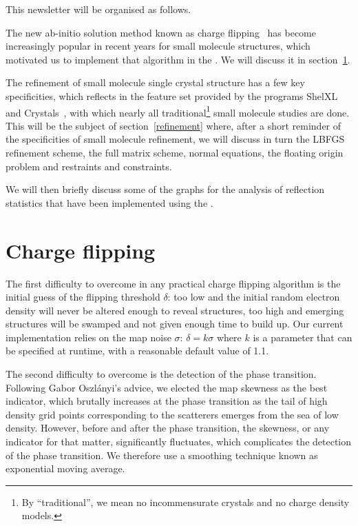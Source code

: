 \documentclass[12pt]{article}
\begin{document}
This newsletter will be organised as follows.

The new ab-initio solution method known as charge flipping~\cite{Oszlanyi:2008,Palatinus:2007} has become increasingly popular in recent years for small molecule structures, which motivated us to implement that algorithm in the \smtbx. We will discuss it in section~\ref{chargeflipping}.

The refinement of small molecule single crystal structure has a few key specificities, which reflects in the feature set provided by the programs ShelXL~\cite{Sheldrick:2008} and Crystals~\cite{Crystals:v12}, with which nearly all traditional\footnote{By ``traditional'', we mean no incommensurate crystals and no charge density models.} small molecule studies are done.
This will be the subject of section~\ref{refinement} where, after a short reminder of the specificities of small molecule refinement, we will discuss in turn the LBFGS refinement scheme, the full matrix scheme, normal equations, the floating origin problem and restraints and constraints.

We will then briefly discuss some of the graphs for the analysis of reflection statistics that have been implemented using the \cctbx.


\section{Charge flipping}
\label{chargeflipping}
The first difficulty to overcome in any practical charge flipping algorithm is the initial guess of the flipping threshold $\delta$: too low and the initial random electron density will never be altered enough to reveal structures, too high and emerging structures will be swamped and not given enough time to build up. Our current implementation relies on the map noise $\sigma$: $\delta = k \sigma$ where $k$ is a parameter that can be specified at runtime, with a reasonable default value of 1.1.

The second difficulty to overcome is the detection of the phase transition.  Following Gabor Oszlányi's advice, we elected the map skewness as the best indicator, which brutally increases at the phase transition as the tail of high density grid points corresponding to the scatterers emerges from the sea of low density. However, before and after the phase transition, the skewness, or any indicator for that matter, significantly fluctuates, which complicates the detection of the phase transition. We therefore use a smoothing technique known as exponential moving average.
\end{document}
